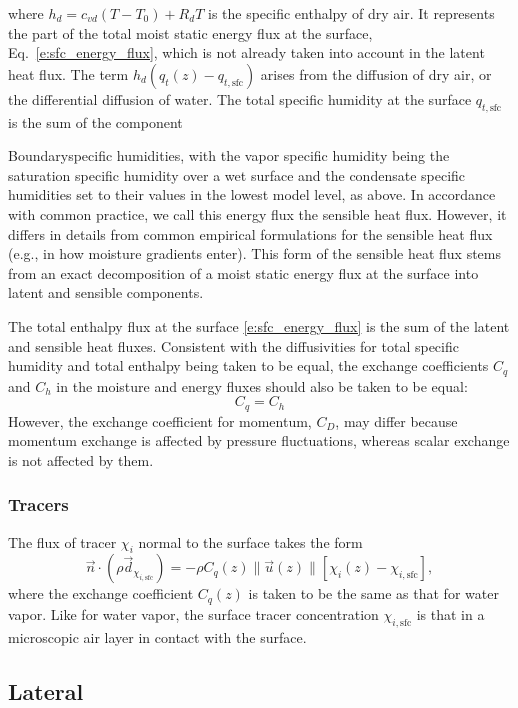 \documentclass{report}
\begin{document}
where $h_d = c_{vd} (T - T_0) + R_d T$ is the specific enthalpy of dry air. It represents the part of the total moist static energy flux at the surface, Eq.~\eqref{e:sfc_energy_flux}, which is not already taken into account in the latent heat flux. The term $h_d (q_t(z) - q_{t, \mathrm{sfc}})$ arises from the diffusion of dry air, or the differential diffusion of water. The total specific humidity at the surface $q_{t, \mathrm{sfc}}$ is the sum of the component {Boundaryspecific humidities, with the vapor specific humidity being the saturation specific humidity over a wet surface and the condensate specific humidities set to their values in the lowest model level, as above. In accordance with common practice, we call this energy flux the sensible heat flux. However, it differs in details from common empirical formulations for the sensible heat flux (e.g., in how moisture gradients enter). This form of the sensible heat flux stems from an exact decomposition of a moist static energy flux at the surface into latent and sensible components. 

The total enthalpy flux at the surface \eqref{e:sfc_energy_flux} is the sum of the latent and sensible heat fluxes. Consistent with the diffusivities for total specific humidity and total enthalpy being taken to be equal, the exchange coefficients $C_q$ and $C_h$ in the moisture and energy fluxes should also be taken to be equal:
\[
C_q = C_h
\]
However, the exchange coefficient for momentum, $C_D$, may differ because momentum exchange is affected by pressure fluctuations, whereas scalar exchange is not affected by them.

\subsubsection{Tracers}

The flux of tracer $\chi_i$ normal to the surface takes the form 
\begin{equation}\label{e:sfc_tracer}
 \vec{n} \cdot (\rho \vec{d}_{\chi_{i, \mathrm{sfc}}}) = - \rho C_q(z) \| \vec{u}(z) \| \left[\chi_i(z) - \chi_{i, \mathrm{sfc}} \right],
\end{equation} 
where the exchange coefficient $C_q(z)$ is taken to be the same as that for water vapor. Like for water vapor, the surface tracer concentration $\chi_{i, \mathrm{sfc}}$ is that in a microscopic air layer in contact with the surface.

\subsection{Lateral}

}
\end{document}
